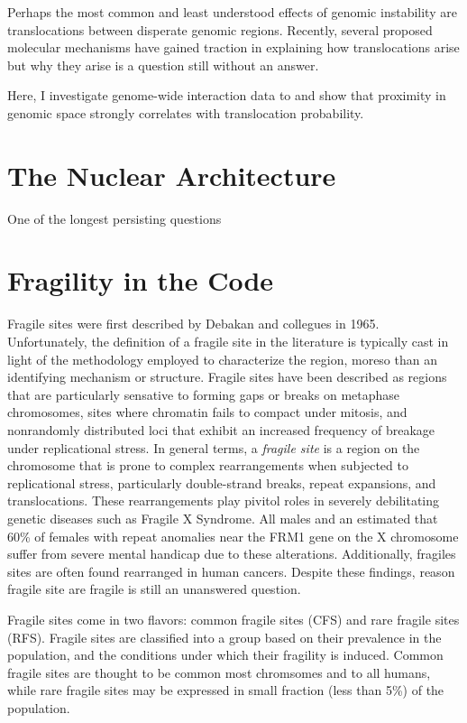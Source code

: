 \documentclass[phd,tocprelim]{cornell}
\begin{document}
Perhaps the most common and least understood effects of genomic instability are
translocations between disperate genomic regions.  Recently, several proposed
molecular mechanisms have gained traction in explaining how translocations arise
but why they arise is a question still without an answer.

Here, I investigate genome-wide interaction data to and show that proximity in
genomic space strongly correlates with translocation probability.

\chapter{The Nuclear Architecture}

One of the longest persisting questions


\chapter{Fragility in the Code}

Fragile sites were first described by Debakan and collegues in
1965\cite{leyden2008}.  Unfortunately, the definition of a fragile site in the
literature is typically cast in light of the methodology employed to 
characterize the region, moreso than an identifying mechanism or structure. 
Fragile sites have been described as regions that are particularly sensative to
forming gaps or breaks on metaphase chromosomes\cite{glover2005}, sites where
chromatin fails to compact under mitosis\cite{leyden2008}, and nonrandomly
distributed loci that exhibit an increased frequency of breakage under
replicational stress\cite{franchitto2013}.  In general terms, a
\textit{fragile site} is a region on the chromosome that is prone to complex
rearrangements when subjected to replicational stress, particularly
double-strand breaks, repeat expansions, and translocations.  These
rearrangements play pivitol roles in severely debilitating genetic diseases
such as Fragile X Syndrome.  All males and an estimated that 60\% of females
with repeat anomalies near the FRM1 gene on the X chromosome suffer
from severe mental handicap due to these alterations\cite{sutherland1995}.
Additionally, fragiles sites are often found rearranged in human
cancers\cite{glover2005}.  Despite these findings, reason fragile site are
fragile is still an unanswered question.


Fragile sites come in two flavors: common fragile sites (CFS) and rare fragile
sites (RFS).  Fragile sites are classified into a group based on their
prevalence in the population, and the conditions under which their fragility
is induced\cite{leyden2008}.  Common fragile sites are thought to be common 
most chromsomes and to all humans, while rare fragile sites may be expressed
in small fraction (less than 5\%) of the population\cite{wells2006}.  
\end{document}
